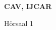 \documentclass[a4paper]{article}
\begin{document}
\printGenericVSLHeader
\begin{center}
\begin{vsltext}{3cm}{4cm}

   \vspace{0.5cm} 

    \textbf{CAV, IJCAR} 

    \vspace{1.5cm}

    Hörsaal 1

\end{vsltext}

\end{center}
\end{document}
